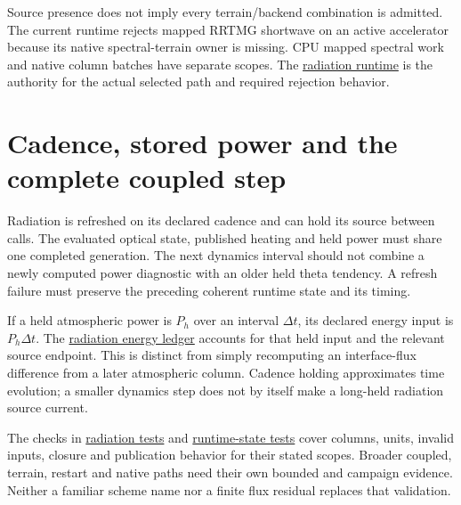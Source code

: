 Source presence does not imply every terrain/backend combination is admitted.
The current runtime rejects mapped RRTMG shortwave on an active accelerator
because its native spectral-terrain owner is missing. CPU mapped spectral work
and native column batches have separate scopes. The
\href{../src/radiation/runtime.cpp}{radiation runtime} is the authority for the
actual selected path and required rejection behavior.

\section{Cadence, stored power and the complete coupled step}

Radiation is refreshed on its declared cadence and can hold its source between
calls. The evaluated optical state, published heating and held power must share
one completed generation. The next dynamics interval should not combine a newly
computed power diagnostic with an older held theta tendency. A refresh failure
must preserve the preceding coherent runtime state and its timing.

If a held atmospheric power is $P_h$ over an interval $\Delta t$, its declared
energy input is $P_h\Delta t$. The
\href{../src/radiation/energy_ledger.cpp}{radiation energy ledger} accounts for
that held input and the relevant source endpoint. This is distinct from simply
recomputing an interface-flux difference from a later atmospheric column.
Cadence holding approximates time evolution; a smaller dynamics step does not
by itself make a long-held radiation source current.

The checks in \href{../tests/physics/test_radiation.cpp}{radiation tests} and
\href{../tests/physics/test_radiation_runtime_state.cpp}{runtime-state tests}
cover columns, units, invalid inputs, closure and publication behavior for their
stated scopes. Broader coupled, terrain, restart and native paths need their own
bounded and campaign evidence. Neither a familiar scheme name nor a finite
flux residual replaces that validation.
